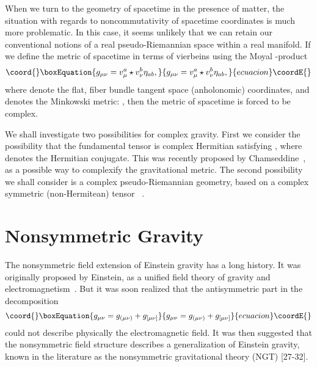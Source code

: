 \documentclass[a4paper,10pt]{article}
\begin{document}
When we turn to the geometry of spacetime in the
presence of matter, the situation with regards to noncommutativity of
spacetime coordinates is much more problematic. In this case, it seems
unlikely that we can retain our conventional notions of a real
pseudo-Riemannian space within a real manifold. If we define the metric of
spacetime in terms of vierbeins \coordHE{} using the Moyal \myHighlight{$\star$}\coordHE{}-product
\begin{equation}\coord{}\boxEquation{
g_{\mu\nu}=v^a_\mu\star v^b_\nu\eta_{ab},
}{
g_{\mu\nu}=v^a_\mu\star v^b_\nu\eta_{ab},
}{ecuacion}\coordE{}\end{equation}
where \coordHE{} denote the flat, fiber bundle tangent space
(anholonomic) coordinates, and \coordHE{} denotes the Minkowski metric:
\coordHE{}, then the metric of spacetime is
forced to be complex.

We shall investigate two possibilities for complex gravity.
First we consider the possibility that the fundamental tensor \coordHE{}
is complex Hermitian satisfying \coordHE{}, where
\myHighlight{$\dagger$}\coordHE{} denotes the Hermitian conjugate. This was recently proposed by
Chamseddine~\cite{Chamseddine,Majid}, as a possible way to complexify the
gravitational metric. The second possibility we shall consider is a
complex pseudo-Riemannian geometry, based on a complex symmetric
(non-Hermitean) tensor \coordHE{}~\cite{Moffat,Moffat2,Moffat3}.

\section{Nonsymmetric Gravity}

The nonsymmetric field extension of Einstein gravity has a long history.
It was originally proposed by Einstein, as a unified field theory of gravity and
electromagnetism~\cite{Einstein,Straus}. But it was soon realized that the
antisymmetric part \coordHE{} in the decomposition
\begin{equation}\coord{}\boxEquation{
\label{nonsymmetric}
g_{\mu\nu}=g_{(\mu\nu)}+g_{[\mu\nu]}
}{
g_{\mu\nu}=g_{(\mu\nu)}+g_{[\mu\nu]}
}{ecuacion}\coordE{}\end{equation}
could not describe physically the electromagnetic field. It was then
suggested that the nonsymmetric field structure describes a
generalization of Einstein gravity, known in the literature as the nonsymmetric
gravitational theory
(NGT) [27-32].
\end{document}
